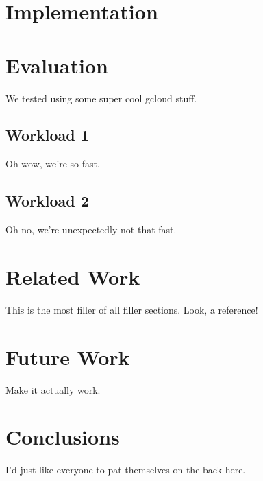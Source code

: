 \documentclass[11pt,english,twocolumn]{article}
\begin{document}
\section{Implementation}

\section{Evaluation}
We tested using some super cool gcloud stuff.

\subsection{Workload 1}
Oh wow, we're so fast.

\subsection{Workload 2}
Oh no, we're unexpectedly not that fast.

\section{Related Work}
This is the most filler of all filler sections. Look, a reference! \cite{dynamo}

\section{Future Work}
Make it actually work.

\section{Conclusions}
I'd just like everyone to pat themselves on the back here.

 

\end{document}
